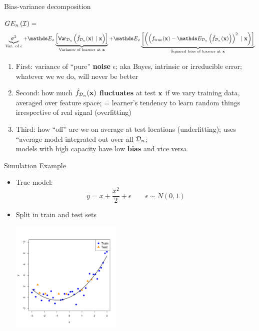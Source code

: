 \documentclass[11pt,compress,t,notes=noshow, xcolor=table]{beamer}
\begin{document}
\begin{vbframe} {Bias-variance decomposition}


$GE_n\left(\mathcal{I}\right) =$  
$$
 \underbrace{\sigma^2}_{\text{Var. of $\epsilon$}} + \E_{x}\underbrace{\left[\var_{\D_n}\left(\fh_{\D_n}(\xv) ~|~\xv\right)\right]}_{\text{Variance of learner at } \xv} + \E_{x}\underbrace{\left[\left(\left(\ftrue(\xv)-\E_{\D_n}\left(\fh_{\D_n}(\xv)\right)\right)^2~|~\xv\right)\right]}_{\text{Squared bias of learner at } \xv}  
$$

\begin{enumerate}
  \item First: variance of ``pure''
     \textbf{noise} $\epsilon$; aka Bayes, intrinsic or irreducible error; 
    whatever we we do, will never be better
  \item Second: how much \textbf{$\hat{f}_{\mathcal{D}_n}(\mathbf{x})$ fluctuates} at test $\mathbf{x}$ if we vary training data, averaged over feature space; = learner's tendency to learn random things irrespective of real signal (overfitting)
  
  \item Third: how ``off'' are we on average at test locations (underfitting); uses ``average model integrated out over all $\mathcal{D}_n$; \\
  models with high capacity have low \textbf{bias} and vice versa
\end{enumerate}


\end{vbframe} 

\begin{vbframe} {Simulation Example}

\begin{itemize}
\item True model:
$$y = x + \frac{x^2}{2} + \epsilon  \qquad \epsilon \sim 
N (0, 1)$$
\item Split in train and test sets 
\begin{center}
  \includegraphics[width = 0.42\textwidth]{figure/bias_variance_decomposition-train_test.png}
\end{center}

\end{itemize}

\end{vbframe} 
\end{document}
